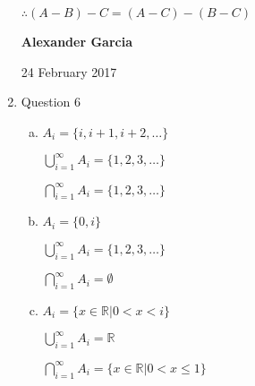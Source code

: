 \documentclass[11pt]{article}
\begin{document}
\begin{enumerate}
		$\therefore (A-B)-C = (A-C) - (B-C)$ \\

		\newpage

		\textbf{Alexander Garcia}

		24 February 2017 \\

	\item Question 6

		\begin{enumerate}[(a)]
				
		\item $A_i = \{i, i + 1, i + 2, \dots\}$

			$\bigcup\limits_{i = 1}^{\infty} A_i = \{1, 2, 3, \dots\}$

			$\bigcap\limits_{i = 1}^{\infty} A_i = \{1, 2, 3, \dots\}$ 

		\item $A_i = \{0, i\}$ 

			$\bigcup\limits_{i = 1}^{\infty} A_i = \{1, 2, 3, \dots\}$

			$\bigcap\limits_{i = 1}^{\infty} A_i = \emptyset$

		\item $A_i = \{x \in \mathbb{R} | 0 < x < i\}$

			$\bigcup\limits_{i = 1}^{\infty} A_i = \mathbb{R}$

			$\bigcap\limits_{i = 1}^{\infty} A_i = \{x \in \mathbb{R} | 0 < x \leq 1\}$

		\end{enumerate}

\end{enumerate}
\end{document}
